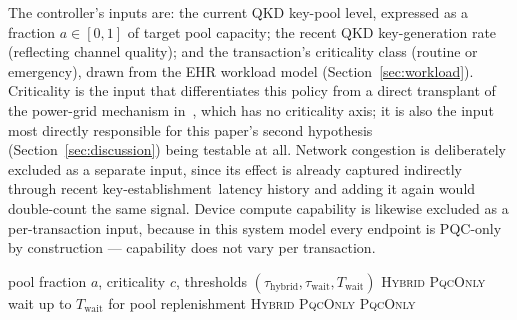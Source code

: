 \documentclass[journal]{IEEEtran}
\newcommand{\keyest}{key-establishment}
\newcommand{\qkdavail}{\ensuremath{a}}
\begin{document}
The controller's inputs are: the current QKD key-pool level, expressed as a fraction $\qkdavail \in [0,1]$ of target pool capacity; the recent QKD key-generation rate (reflecting channel quality); and the transaction's criticality class (routine or emergency), drawn from the EHR workload model (Section~\ref{sec:workload}). Criticality is the input that differentiates this policy from a direct transplant of the power-grid mechanism in~\cite{zhu2025technoeconomic}, which has no criticality axis; it is also the input most directly responsible for this paper's second hypothesis (Section~\ref{sec:discussion}) being testable at all. Network congestion is deliberately excluded as a separate input, since its effect is already captured indirectly through recent \keyest\ latency history and adding it again would double-count the same signal. Device compute capability is likewise excluded as a per-transaction input, because in this system model every endpoint is PQC-only by construction --- capability does not vary per transaction.

\begin{algorithm}[t]
\caption{Adaptive mode selection}
\label{alg:selectmode}
\begin{algorithmic}[1]
\REQUIRE pool fraction $\qkdavail$, criticality $c$, thresholds $(\tau_{\text{hybrid}}, \tau_{\text{wait}}, T_{\text{wait}})$
\IF{$\qkdavail \geq \tau_{\text{hybrid}}$}
    \RETURN \textsc{Hybrid}
\ENDIF
{}
    \RETURN \textsc{PqcOnly} 
\ENDIF
\IF{$\qkdavail \geq \tau_{\text{wait}}$}
    \STATE wait up to $T_{\text{wait}}$ for pool replenishment
    \IF{$\qkdavail_{\text{after}} \geq \tau_{\text{hybrid}}$}
        \RETURN \textsc{Hybrid}
    \ELSE
        \RETURN \textsc{PqcOnly}
    \ENDIF
\ENDIF
\RETURN \textsc{PqcOnly} 
\end{algorithmic}
\end{algorithm}
\end{document}
